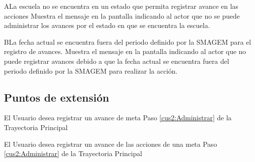     \begin{UCtrayectoriaA}{A}{La escuela no se encuentra en un estado que permita registrar avance en las acciones}
    \UCpaso[\UCactor] Muestra el mensaje  en la pantalla  indicando al actor que no se puede administrar los avances por el estado en que se encuentra la escuela.
    \end{UCtrayectoriaA}

    \begin{UCtrayectoriaA}{B}{La fecha actual se encuentra fuera del periodo definido por la SMAGEM para el registro de avances.}
    \UCpaso[\UCsist] Muestra el mensaje  en la pantalla  indicando al actor que no puede registrar avances debido a que la fecha actual se encuentra fuera del periodo definido por la SMAGEM para realizar la acción. 
    \end{UCtrayectoriaA}

\subsection{Puntos de extensión}

\UCExtensionPoint
{El Usuario desea registrar un avance de meta}
{Paso \ref{cus2:Administrar} de la Trayectoria Principal}
{}

\UCExtensionPoint
{El Usuario desea registrar un avance de las acciones de una meta}
{Paso \ref{cus2:Administrar} de la Trayectoria Principal}
{}